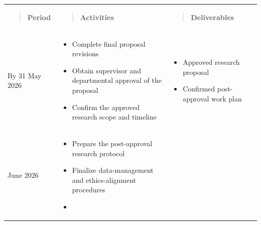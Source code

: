 \documentclass[
]{article}
\newcounter{none} %
\begin{document}
{\def\LTcaptype{none} %
\begin{longtable}[]{@{}
  >{\centering\arraybackslash}p{}
  >{\centering\arraybackslash}p{}
  >{\centering\arraybackslash}p{}@{}}
\toprule\noalign{}
\endhead
\bottomrule\noalign{}
\endlastfoot
\begin{minipage}[t]{\linewidth}\centering
\begin{quote}
\textbf{Period}
\end{quote}
\end{minipage} & \begin{minipage}[t]{\linewidth}\centering
\begin{quote}
\textbf{Activities}
\end{quote}
\end{minipage} & \begin{minipage}[t]{\linewidth}\centering
\begin{quote}
\textbf{Deliverables}
\end{quote}
\end{minipage} \\
By 31 May 2026 & \begin{minipage}[t]{\linewidth}\centering
\begin{itemize}
\item
  Complete final proposal revisions
\item
  Obtain supervisor and departmental approval of the proposal
\item
  Confirm the approved research scope and timeline
\end{itemize}
\end{minipage} & \begin{minipage}[t]{\linewidth}\centering
\begin{itemize}
\item
  Approved research proposal
\item
  Confirmed post-approval work plan
\end{itemize}
\end{minipage} \\
June 2026 & \begin{minipage}[t]{\linewidth}\centering
\begin{itemize}
\item
  Prepare the post-approval research protocol
\item
  Finalize data-management and ethics-alignment procedures
\item

\end{itemize}
\end{minipage}
\end{longtable}}
\end{document}
